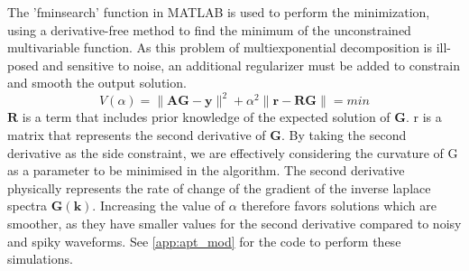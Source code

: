 The 'fminsearch' function in MATLAB is used to perform the minimization, using a derivative-free method to find the minimum of the unconstrained multivariable function.
As this problem of multiexponential decomposition is ill-posed and sensitive to noise, an additional regularizer must be added to constrain and smooth the output solution.
\begin{equation}
    V(\alpha) = \lVert \mathbf{AG} - \mathbf{y}\lVert^{2}+\alpha^{2}\lVert \mathbf{r} - \mathbf{RG}\lVert  = min
\end{equation}
$\mathbf{R}$ is a term that includes prior knowledge of the expected solution of $\mathbf{G}$. r is a matrix that represents the second derivative of $\mathbf{G}$. By taking the second derivative as the side constraint, we are effectively considering the curvature of G as a parameter to be minimised in the algorithm. The second derivative physically represents the rate of change of the gradient of the inverse laplace spectra $\mathbf{G(k)}$. Increasing the value of $\alpha$ therefore favors solutions which are smoother, as they have smaller values for the second derivative compared to noisy and spiky waveforms. See \autoref{app:apt_mod} for the code to perform these simulations.
